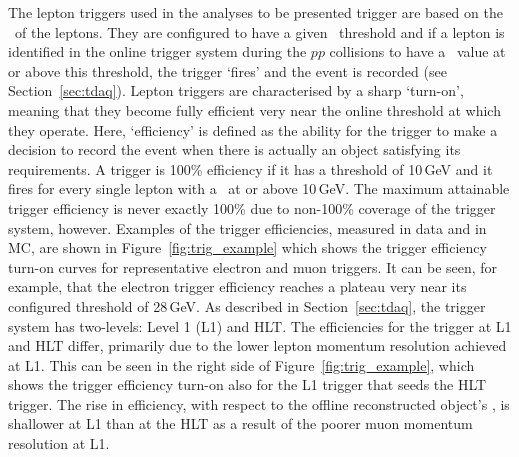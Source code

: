 The lepton triggers used in the analyses to be presented trigger are based on the \pT~of the leptons.
They are configured to have a given \pT~threshold and if a lepton is identified in the online trigger
system during the $pp$ collisions to have a \pT~value at or above this threshold, the trigger `fires' and the
event is recorded (see Section~\ref{sec:tdaq}).
Lepton triggers are characterised by a sharp `turn-on', meaning that they become fully efficient
very near the online threshold at which they operate. 
Here, `efficiency' is defined as the ability for the trigger to make a decision to record the event
when there is actually an object satisfying its requirements. A trigger is 100\% efficiency if it
has a threshold of 10\,GeV and it fires for every single lepton with a \pT~at or above 10\,GeV.
The maximum attainable trigger efficiency is never exactly 100\% due to non-100\% coverage of the
trigger system, however.
Examples of the trigger efficiencies, measured in data and in MC, are shown in Figure~\ref{fig:trig_example} which shows
the trigger efficiency turn-on curves for representative electron and muon triggers.
It can be seen, for example, that the electron trigger efficiency reaches a plateau very near
its configured threshold of 28\,GeV.
As described in Section~\ref{sec:tdaq}, the trigger system has two-levels: Level 1 (L1) and HLT.
The efficiencies for the trigger at L1 and HLT differ, primarily due to the lower lepton momentum resolution
achieved at L1.
This can be seen in the right side of Figure~\ref{fig:trig_example}, which shows the trigger
efficiency turn-on also for the L1 trigger that seeds the HLT trigger.
The rise in efficiency, with respect to the offline reconstructed object's \pT, is shallower
at L1 than at the HLT as a result of the poorer muon momentum resolution at L1.

